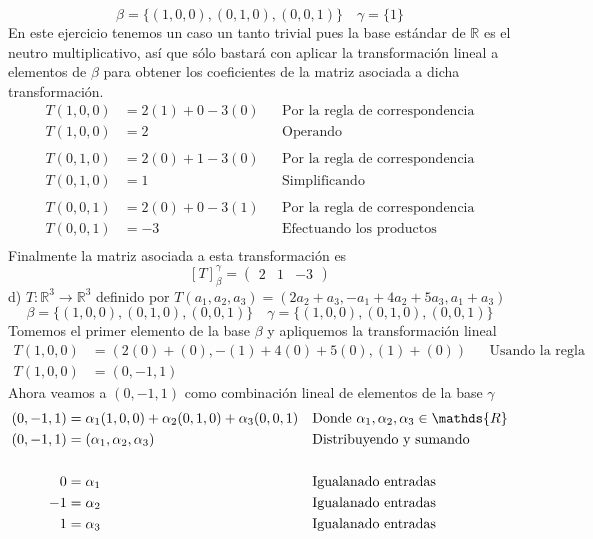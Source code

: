 \documentclass[letterpaper]{article}
\newcommand{\R}{\mathds{R}}
\renewcommand{\*}{\cdot}
\theoremstyle{definition}
\begin{document}
		\[ \beta = \lbrace (1,0,0),(0,1,0),(0,0,1) \rbrace \quad \gamma = \lbrace 1 \rbrace \]
		En este ejercicio tenemos un caso un tanto trivial pues la base estándar de $ \R $ es el neutro multiplicativo, así que sólo bastará con aplicar la transformación lineal a elementos de $ \beta $ para obtener los coeficientes de la matriz asociada a dicha transformación.
		\begin{align*}
			T(1,0,0) &= 2(1) + 0 - 3(0) && \text{Por la regla de correspondencia}\\
			T(1,0,0) &= 2 && \text{Operando}\\
			\\
			T(0,1,0) &= 2(0) + 1 - 3(0) && \text{Por la regla de correspondencia}\\
			T(0,1,0) &= 1 && \text{Simplificando}\\
			\\
			T(0,0,1) &= 2(0) + 0 - 3(1) && \text{Por la regla de correspondencia}\\
			T(0,0,1) &=- 3 && \text{Efectuando los productos}\\
		\end{align*}
		Finalmente la matriz asociada a esta transformación es 
		\[ [T]_{\beta}^{\gamma} = \begin{pmatrix}
		2 & 1 & -3
		\end{pmatrix}  \]
		d) $T: \mathbb{R}^{3} \longrightarrow \mathbb{R}^{3}$ definido por $T(a_{1},a_{2},a_{3}) = (2a_{2} + a_{3}, -a_{1} + 4a_{2} + 5a_{3},a_{1} + a_{3})$
		\[ \beta = \lbrace (1,0,0),(0,1,0),(0,0,1) \rbrace \quad \gamma = \lbrace (1,0,0),(0,1,0),(0,0,1) \rbrace\]
		Tomemos el primer elemento de la base $ \beta $ y apliquemos la transformación lineal
		\begin{align*}
			T(1,0,0) &= (2(0)+ (0), -(1) + 4(0) + 5(0),(1) +(0)) && \text{Usando la regla de correspondencia}\\
			T(1,0,0) &= (0,-1,1) &&
		\end{align*}
		Ahora veamos a $ (0,-1,1) $ como combinación lineal de elementos de la base $ \gamma $
		\begin{align*}
			(0,-1,1) &= \alpha_1(1,0,0) + \alpha_2(0,1,0) + \alpha_3(0,0,1) && \text{Donde $ \alpha_1,\alpha_2,\alpha_3 \in \R$}\\
			(0,-1,1) &= ( \alpha_1,  \alpha_2,  \alpha_3) && \text{Distribuyendo y sumando}\\
			\\
			0 &= \alpha_1 && \text{Igualanado entradas}\\
			-1 &= \alpha_2 && \text{Igualanado entradas}\\
			1 &= \alpha_3 && \text{Igualanado entradas}\\
		\end{align*}
\end{document}
